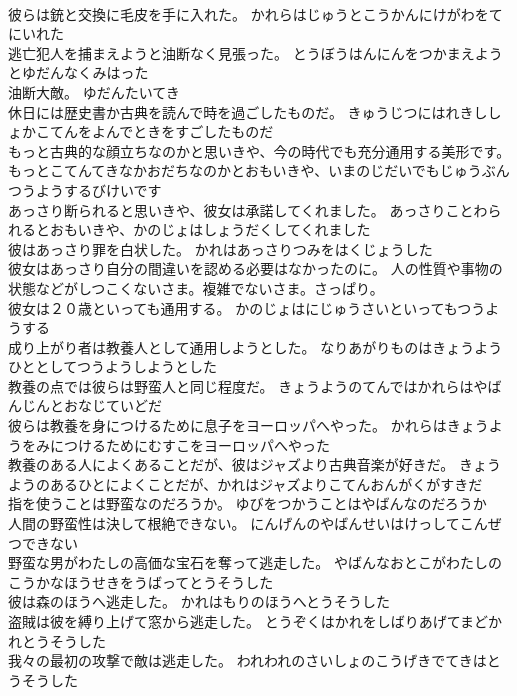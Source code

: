 \documentclass[8pt]{extreport}
\begin{document}
\begin{CJK}{UTF8}{min}
\\	彼らは銃と交換に毛皮を手に入れた。	かれらはじゅうとこうかんにけがわをてにいれた 
\\	逃亡犯人を捕まえようと油断なく見張った。	とうぼうはんにんをつかまえようとゆだんなくみはった 
\\	油断大敵。	ゆだんたいてき 
\\	休日には歴史書か古典を読んで時を過ごしたものだ。	きゅうじつにはれきししょかこてんをよんでときをすごしたものだ 
\\	もっと古典的な顔立ちなのかと思いきや、今の時代でも充分通用する美形です。	もっとこてんてきなかおだちなのかとおもいきや、いまのじだいでもじゅうぶんつうようするびけいです 
\\	あっさり断られると思いきや、彼女は承諾してくれました。	あっさりことわられるとおもいきや、かのじょはしょうだくしてくれました 
\\	彼はあっさり罪を白状した。	かれはあっさりつみをはくじょうした 
\\	彼女はあっさり自分の間違いを認める必要はなかったのに。	人の性質や事物の状態などがしつこくないさま。複雑でないさま。さっぱり。
\\	彼女は２０歳といっても通用する。	かのじょはにじゅうさいといってもつうようする 
\\	成り上がり者は教養人として通用しようとした。	なりあがりものはきょうようひととしてつうようしようとした 
\\	教養の点では彼らは野蛮人と同じ程度だ。	きょうようのてんではかれらはやばんじんとおなじていどだ 
\\	彼らは教養を身につけるために息子をヨーロッパへやった。	かれらはきょうようをみにつけるためにむすこをヨーロッパへやった 
\\	教養のある人によくあることだが、彼はジャズより古典音楽が好きだ。	きょうようのあるひとによくことだが、かれはジャズよりこてんおんがくがすきだ 
\\	指を使うことは野蛮なのだろうか。	ゆびをつかうことはやばんなのだろうか 
\\	人間の野蛮性は決して根絶できない。	にんげんのやばんせいはけっしてこんぜつできない 
\\	野蛮な男がわたしの高価な宝石を奪って逃走した。	やばんなおとこがわたしのこうかなほうせきをうばってとうそうした 
\\	彼は森のほうへ逃走した。	かれはもりのほうへとうそうした 
\\	盗賊は彼を縛り上げて窓から逃走した。	とうぞくはかれをしばりあげてまどかれとうそうした 
\\	我々の最初の攻撃で敵は逃走した。	われわれのさいしょのこうげきでてきはとうそうした 

\end{CJK}
\end{document}
